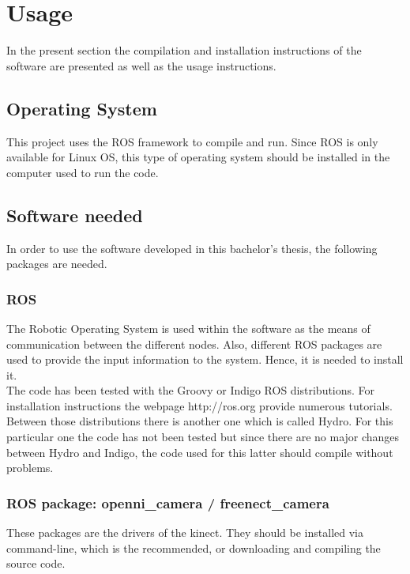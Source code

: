 \section{Usage}
\label{usage}

In the present section the compilation and installation instructions of the software are presented as well as the usage instructions. 

\subsection{Operating System}
This project uses the ROS framework to compile and run. Since ROS is only available for Linux OS, this type of operating system should be installed in the computer used to run the code. 


\subsection{Software needed}
In order to use the software developed in this bachelor's thesis, the following packages are needed. 
\subsubsection{ROS}
The Robotic Operating System is used within the software as the means of communication between the different nodes. Also, different ROS packages are used to provide the input information to the system. Hence, it is needed to install it. 
\\

The code has been tested with the Groovy or Indigo ROS distributions. For installation instructions the webpage http://ros.org provide numerous tutorials. 
\\

Between those distributions there is another one which is called Hydro. For this particular one the code has not been tested but since there are no major changes between Hydro and Indigo, the code used for this latter should compile without problems. 


\subsubsection{ROS package: openni\_camera / freenect\_camera}
These packages are the drivers of the kinect. They should be installed via command-line, which is the recommended, or downloading and compiling the source code. 
\\

